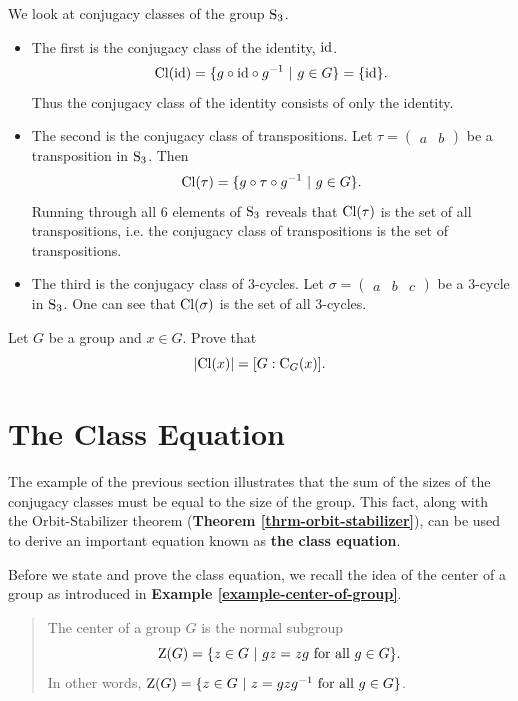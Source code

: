 \begin{example}\label{example-conjugacy-classes-of-Sn3}
    We look at conjugacy classes of the group $\mathrm{S}_{3}$.
    \begin{itemize}
        \item The first is the conjugacy class of the identity, $\mathrm{id}$.
        \[
            \mathrm{Cl}(\mathrm{id}) = \{g\circ\mathrm{id}\circ g^{-1} \ | \ g \in G \} = \{\mathrm{id}\}.
        \]
        Thus the conjugacy class of the identity consists of only the identity.
        \item The second is the conjugacy class of transpositions. Let $\tau = \begin{pmatrix}a & b\end{pmatrix}$ be a transposition in $\mathrm{S}_{3}$. Then
        \[
            \Cl{\tau} = \{g\circ\tau\circ g^{-1} \ | \ g \in G\}.
        \]
        Running through all 6 elements of $\mathrm{S}_{3}$ reveals that $\mathrm{Cl}(\tau)$ is the set of all transpositions, i.e. the conjugacy class of transpositions is the set of transpositions.
        \item The third is the conjugacy class of 3-cycles. Let $\sigma = \begin{pmatrix}a & b & c\end{pmatrix}$ be a 3-cycle in $\mathrm{S}_{3}$. One can see that $\mathrm{Cl}(\sigma)$ is the set of all 3-cycles.
    \end{itemize}
\end{example}

\begin{exercise}\label{exercise-order-of-conjugacy-class}
    Let $G$ be a group and $x \in G$. Prove that
    \[
        |\mathrm{Cl}(x)| = [G : \mathrm{C}_{G}(x)].
    \]
\end{exercise}

\section{The Class Equation}
The example of the previous section illustrates that the sum of the sizes of the conjugacy classes must be equal to the size of the group. This fact, along with the Orbit-Stabilizer theorem (\textbf{Theorem \ref{thrm-orbit-stabilizer}}), can be used to derive an important equation known as \textbf{the class equation}.

Before we state and prove the class equation, we recall the idea of the center of a group as introduced in \textbf{Example \ref{example-center-of-group}}.
\begin{quote}
    The center of a group $G$ is the normal subgroup
    \[
        \Z{G} = \{z \in G \ | \ gz = zg \text{ for all } g \in G\}.
    \]
    In other words, $\mathrm{Z}(G) = \{z \in G \ | \ z = gzg^{-1} \text{ for all } g \in G\}$.
\end{quote}


